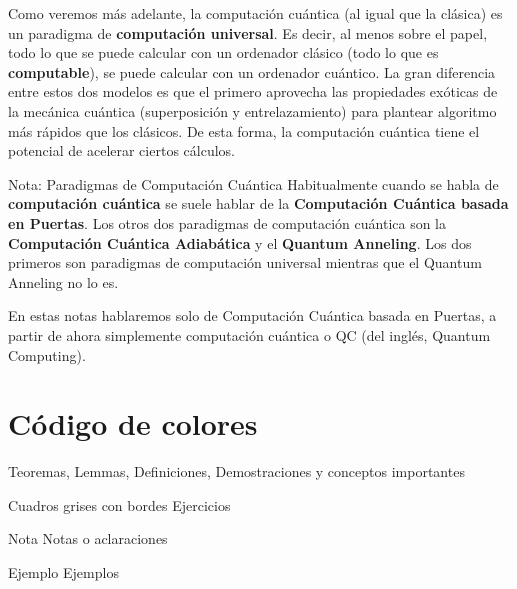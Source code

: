 \documentclass[a4paper,11pt]{book} %
\numberwithin{equation}{chapter}
\begin{document}
Como veremos más adelante, la computación cuántica (al igual que la clásica) es un paradigma de \textbf{computación universal}. Es decir, al menos sobre el papel, todo lo que se puede calcular con un ordenador clásico (todo lo que es \textbf{computable}), se puede calcular con un ordenador cuántico. La gran diferencia entre estos dos modelos es que el primero aprovecha las propiedades exóticas de la mecánica cuántica (superposición y entrelazamiento) para plantear algoritmo más rápidos que los clásicos. De esta forma, la computación cuántica tiene el potencial de acelerar ciertos cálculos. 


	\begin{mybox_blue}{Nota: Paradigmas de Computación Cuántica}
Habitualmente cuando se habla de \textbf{computación cuántica} se suele hablar de la \textbf{Computación Cuántica basada en Puertas}. Los otros dos paradigmas de computación cuántica son la \textbf{Computación Cuántica Adiabática} y el \textbf{Quantum Anneling}. Los dos primeros son paradigmas de computación	universal mientras que el Quantum Anneling no lo es. \vspace{0.3cm}
	
En estas notas hablaremos solo de Computación Cuántica basada en Puertas, a partir de ahora simplemente	computación cuántica o QC (del inglés, Quantum Computing).
	\end{mybox_blue}	




\newpage

\section*{Código de colores}

\begin{mybox_gray2}{}
Teoremas, Lemmas, Definiciones, Demostraciones y conceptos importantes
\end{mybox_gray2}

\begin{mybox_gray}{Cuadros grises con bordes}
Ejercicios
\end{mybox_gray}

\begin{mybox_blue}{Nota}
Notas o aclaraciones
\end{mybox_blue}

\begin{mybox_green}{Ejemplo}
Ejemplos
\end{mybox_green}
\end{document}
